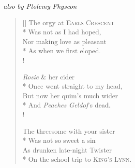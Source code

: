 \begin{center}
{\it also by Ptolemy Physcon}
\end{center}

\bigskip

\begin{verse}[\versewidth]
The orgy at \textsc{Earls Crescent}\\*
\vin Was not as I had hoped,\\
Nor making love as pleasant\\*
\vin As when we first eloped.\\!

\textit{Rosie} \& her cider\\*
\vin Once went straight to my head,\\
But now her quim's much wider\\*
\vin And \textit{Peaches Geldof}'s dead.\\!

The threesome with your sister\\*
\vin Was not so sweet a sin\\
As drunken late-night Twister\\*
\vin On the school trip to \textsc{King's Lynn}.
\end{verse}
